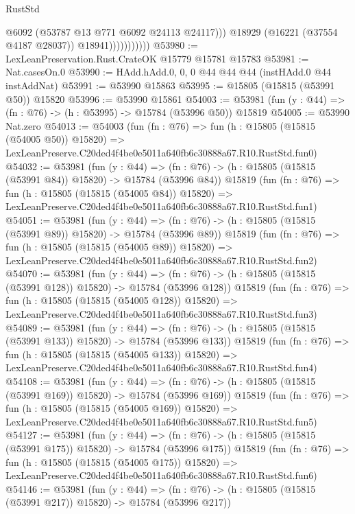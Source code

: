 \begin{lexlean}{RustStd}
\begin{coremodule}
                              @6092
                              (@53787 @13 @771 @6092 @24113 @24117)))
                          @18929
                          (@16221 (@37554 @4187 @28037))
                          @18941)))))))))))
@53980 := LexLeanPreservation.Rust.CrateOK @15779 @15781 @15783
@53981 := Nat.casesOn.{0}
@53990 := HAdd.hAdd.{0, 0, 0} @44 @44 @44 (instHAdd.{0} @44 instAddNat)
@53991 := @53990 @15863
@53995 := @15805 (@15815 (@53991 @50)) @15820
@53996 := @53990 @15861
@54003 := @53981 (fun (y : @44) => (fn : @76) -> (h : @53995) -> @15784 (@53996 @50)) @15819
@54005 := @53990 Nat.zero
@54013 := @54003
    (fun (fn : @76) =>
    fun (h : @15805 (@15815 (@54005 @50)) @15820) =>
    LexLeanPreserve.C20ded4f4be0e5011a640fb6c30888a67.R10.RustStd.fun0)
@54032 := @53981
    (fun (y : @44) =>
    (fn : @76) -> (h : @15805 (@15815 (@53991 @84)) @15820) -> @15784 (@53996 @84))
    @15819
    (fun (fn : @76) =>
    fun (h : @15805 (@15815 (@54005 @84)) @15820) =>
    LexLeanPreserve.C20ded4f4be0e5011a640fb6c30888a67.R10.RustStd.fun1)
@54051 := @53981
    (fun (y : @44) =>
    (fn : @76) -> (h : @15805 (@15815 (@53991 @89)) @15820) -> @15784 (@53996 @89))
    @15819
    (fun (fn : @76) =>
    fun (h : @15805 (@15815 (@54005 @89)) @15820) =>
    LexLeanPreserve.C20ded4f4be0e5011a640fb6c30888a67.R10.RustStd.fun2)
@54070 := @53981
    (fun (y : @44) =>
    (fn : @76) -> (h : @15805 (@15815 (@53991 @128)) @15820) -> @15784 (@53996 @128))
    @15819
    (fun (fn : @76) =>
    fun (h : @15805 (@15815 (@54005 @128)) @15820) =>
    LexLeanPreserve.C20ded4f4be0e5011a640fb6c30888a67.R10.RustStd.fun3)
@54089 := @53981
    (fun (y : @44) =>
    (fn : @76) -> (h : @15805 (@15815 (@53991 @133)) @15820) -> @15784 (@53996 @133))
    @15819
    (fun (fn : @76) =>
    fun (h : @15805 (@15815 (@54005 @133)) @15820) =>
    LexLeanPreserve.C20ded4f4be0e5011a640fb6c30888a67.R10.RustStd.fun4)
@54108 := @53981
    (fun (y : @44) =>
    (fn : @76) -> (h : @15805 (@15815 (@53991 @169)) @15820) -> @15784 (@53996 @169))
    @15819
    (fun (fn : @76) =>
    fun (h : @15805 (@15815 (@54005 @169)) @15820) =>
    LexLeanPreserve.C20ded4f4be0e5011a640fb6c30888a67.R10.RustStd.fun5)
@54127 := @53981
    (fun (y : @44) =>
    (fn : @76) -> (h : @15805 (@15815 (@53991 @175)) @15820) -> @15784 (@53996 @175))
    @15819
    (fun (fn : @76) =>
    fun (h : @15805 (@15815 (@54005 @175)) @15820) =>
    LexLeanPreserve.C20ded4f4be0e5011a640fb6c30888a67.R10.RustStd.fun6)
@54146 := @53981
    (fun (y : @44) =>
    (fn : @76) -> (h : @15805 (@15815 (@53991 @217)) @15820) -> @15784 (@53996 @217))

\end{coremodule}
\end{lexlean}
